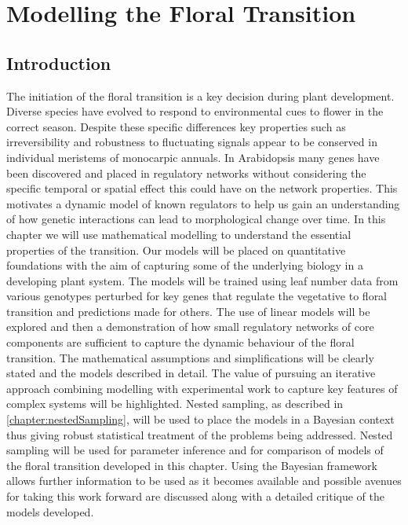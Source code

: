 \chapter{Modelling the Floral Transition}%
\label{chapter:flowering}
\section{Introduction}

The initiation of the floral transition is a key decision during plant development.
Diverse species have evolved to respond to environmental cues to flower in the correct season.
Despite these specific differences key properties such as irreversibility and robustness to fluctuating signals appear to be conserved in individual meristems of monocarpic annuals.
In Arabidopsis many genes have been discovered and placed in regulatory networks without considering the specific temporal or spatial effect this could have on the network properties.
This motivates a dynamic model of known regulators to help us gain an understanding of how genetic interactions can lead to morphological change over time.
In this chapter we will use mathematical modelling to understand the essential properties of the transition.
Our models will be placed on quantitative foundations with the aim of capturing some of the underlying biology in a developing plant system.
The models will be trained using leaf number data from various genotypes perturbed for key genes that regulate the vegetative to floral transition and predictions made for others.
The use of linear models will be explored and then a demonstration of how small regulatory networks of core components are sufficient to capture the dynamic behaviour of the floral transition.
The mathematical assumptions and simplifications will be clearly stated and the models described in detail.
The value of pursuing an iterative approach combining modelling with experimental work to capture key features of complex systems will be highlighted.
Nested sampling, as described in \autoref{chapter:nestedSampling}, will be used to place the models in a Bayesian context thus giving robust statistical treatment of the problems being addressed.
Nested sampling will be used for parameter inference and for comparison of models of the floral transition developed in this chapter.
Using the Bayesian framework allows further information to be used as it becomes available and possible avenues for taking this work forward are discussed along with a detailed critique of the models developed.

